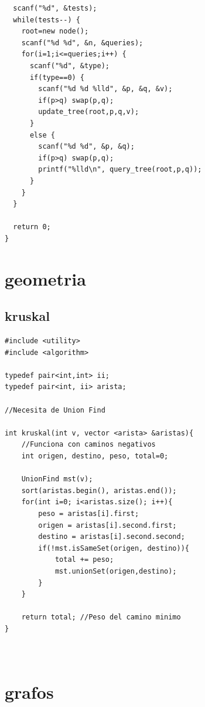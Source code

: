 \documentclass[twoside]{article}
\begin{document}
\begin{multicols*}{2}
\begin{verbatim}
  scanf("%d", &tests);
  while(tests--) {
    root=new node();
    scanf("%d %d", &n, &queries);
    for(i=1;i<=queries;i++) {
      scanf("%d", &type);
      if(type==0) {
        scanf("%d %d %lld", &p, &q, &v);
        if(p>q) swap(p,q);
        update_tree(root,p,q,v);
      } 
      else {
        scanf("%d %d", &p, &q);
        if(p>q) swap(p,q);
        printf("%lld\n", query_tree(root,p,q));
      }
    }
  }
 
  return 0;
}

\end{verbatim}

\sectionfont{\bfseries\sffamily\centering\Huge}
\vspace{1em}
\section*{geometria}
\vspace{3em}
\subsectionfont{\large\bfseries\sffamily\underline}
\subsection*{kruskal}
\begin{verbatim}
#include <utility>
#include <algorithm>

typedef pair<int,int> ii;
typedef pair<int, ii> arista;

//Necesita de Union Find

int kruskal(int v, vector <arista> &aristas){
	//Funciona con caminos negativos
	int origen, destino, peso, total=0;

	UnionFind mst(v);
	sort(aristas.begin(), aristas.end());
	for(int i=0; i<aristas.size(); i++){
		peso = aristas[i].first;
		origen = aristas[i].second.first;
		destino = aristas[i].second.second;
		if(!mst.isSameSet(origen, destino)){
			total += peso;
			mst.unionSet(origen,destino);
		}
	}

	return total; //Peso del camino minimo
}



\end{verbatim}

\sectionfont{\bfseries\sffamily\centering\Huge}
\vspace{1em}
\section*{grafos}
\vspace{3em}
\subsectionfont{\large\bfseries\sffamily\underline}

\end{multicols*}
\end{document}

